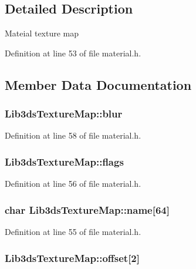 \subsection{Detailed Description}
Mateial texture map 

Definition at line 53 of file material.\-h.



\subsection{Member Data Documentation}
\hypertarget{struct_lib3ds_texture_map_aef8bec2970af2be3dbf50596d888328f}{
\subsubsection[{blur}]{ Lib3ds\-Texture\-Map\-::blur}}\label{struct_lib3ds_texture_map_aef8bec2970af2be3dbf50596d888328f}


Definition at line 58 of file material.\-h.

\hypertarget{struct_lib3ds_texture_map_a9c8f2fbb0613016e0bea680d675d15d2}{
\subsubsection[{flags}]{ Lib3ds\-Texture\-Map\-::flags}}\label{struct_lib3ds_texture_map_a9c8f2fbb0613016e0bea680d675d15d2}


Definition at line 56 of file material.\-h.

\hypertarget{struct_lib3ds_texture_map_a3cf75db1ba9ce54de41601b063a59b05}{
\subsubsection[{name}]{\setlength{\rightskip}{0pt plus 5cm}char Lib3ds\-Texture\-Map\-::name\mbox{[}64\mbox{]}}}\label{struct_lib3ds_texture_map_a3cf75db1ba9ce54de41601b063a59b05}


Definition at line 55 of file material.\-h.

\hypertarget{struct_lib3ds_texture_map_ae068b340929df8d7b61cf3e9e6ab8252}{
\subsubsection[{offset}]{ Lib3ds\-Texture\-Map\-::offset\mbox{[}2\mbox{]}}}\label{struct_lib3ds_texture_map_ae068b340929df8d7b61cf3e9e6ab8252}



